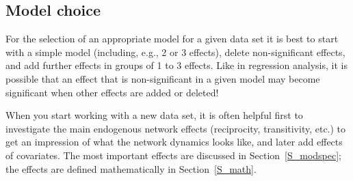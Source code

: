 \documentclass[a4paper,fleqn]{article}
\newcommand{\+}{\, + \,}
\begin{document}
{\begin{print}
\end{print}
\subsection{Model choice}
\label{S_model}

For the selection of an appropriate model for a given data set it
is best to start with a simple model (including, e.g., 2 or 3
effects), delete non-significant effects, and add further effects
in groups of 1 to 3 effects. Like in regression analysis, it is
possible that an effect that is non-significant in a given model
may become significant when other effects are added or deleted!

When you start working with a new data set, it is often helpful first
to investigate the main endogenous network effects (reciprocity,
transitivity, etc.) to get an impression of what the network
dynamics looks like, and later add effects of covariates.
The most important effects are discussed in Section~\ref{S_modspec};
the effects are defined mathematically
in Section~\ref{S_math}.

}
\end{document}
